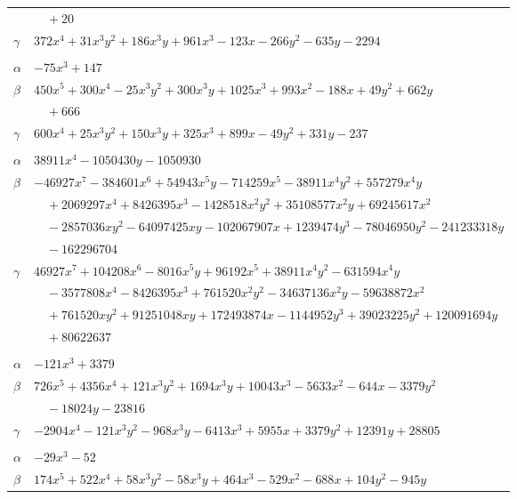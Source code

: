 \documentclass[11pt]{article}
\begin{document}
\begin{longtable}{@{}ll@{}}
 & $\quad +20$\\
$\gamma$ & $372x^{4}+31x^{3}y^{2}+186x^{3}y+961x^{3}-123x-266y^{2}-635y-2294$\\
\addlinespace[3pt]
\multicolumn{2}{@{}l}{$\{i,j\}=\{47,100\}$, $k_{ij}=2^{6}\cdot 3^{2}$}\\
$\alpha$ & $-75x^{3}+147$\\
$\beta$ & $450x^{5}+300x^{4}-25x^{3}y^{2}+300x^{3}y+1025x^{3}+993x^{2}-188x+49y^{2}+662y$\\
 & $\quad +666$\\
$\gamma$ & $600x^{4}+25x^{3}y^{2}+150x^{3}y+325x^{3}+899x-49y^{2}+331y-237$\\
\addlinespace[3pt]
\multicolumn{2}{@{}l}{$\{i,j\}=\{48,97\}$, $k_{ij}=2^{2}\cdot 5^{3}$}\\
$\alpha$ & $38911x^{4}-1050430y-1050930$\\
$\beta$ & $-46927x^{7}-384601x^{6}+54943x^{5}y-714259x^{5}-38911x^{4}y^{2}+557279x^{4}y$\\
 & $\quad +2069297x^{4}+8426395x^{3}-1428518x^{2}y^{2}+35108577x^{2}y+69245617x^{2}$\\
 & $\quad -2857036xy^{2}-64097425xy-102067907x+1239474y^{3}-78046950y^{2}-241233318y$\\
 & $\quad -162296704$\\
$\gamma$ & $46927x^{7}+104208x^{6}-8016x^{5}y+96192x^{5}+38911x^{4}y^{2}-631594x^{4}y$\\
 & $\quad -3577808x^{4}-8426395x^{3}+761520x^{2}y^{2}-34637136x^{2}y-59638872x^{2}$\\
 & $\quad +761520xy^{2}+91251048xy+172493874x-1144952y^{3}+39023225y^{2}+120091694y$\\
 & $\quad +80622637$\\
\addlinespace[3pt]
\multicolumn{2}{@{}l}{$\{i,j\}=\{48,98\}$, $k_{ij}=2^{6}\cdot 5^{3}\cdot 7$}\\
$\alpha$ & $-121x^{3}+3379$\\
$\beta$ & $726x^{5}+4356x^{4}+121x^{3}y^{2}+1694x^{3}y+10043x^{3}-5633x^{2}-644x-3379y^{2}$\\
 & $\quad -18024y-23816$\\
$\gamma$ & $-2904x^{4}-121x^{3}y^{2}-968x^{3}y-6413x^{3}+5955x+3379y^{2}+12391y+28805$\\
\addlinespace[3pt]
\multicolumn{2}{@{}l}{$\{i,j\}=\{50,58\}$, $k_{ij}=2^{2}\cdot 3^{5}\cdot 5$}\\
$\alpha$ & $-29x^{3}-52$\\
$\beta$ & $174x^{5}+522x^{4}+58x^{3}y^{2}-58x^{3}y+464x^{3}-529x^{2}-688x+104y^{2}-945y$\\

\end{longtable}
\end{document}
